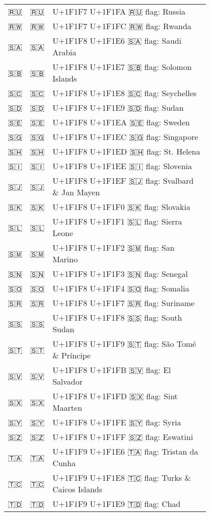 \documentclass[a4paper,12pt]{article}
\newcommand{\fontA}[1]{{\fontspec[RawFeature={mode=harf,+dist,+ccmp}]{Segoe UI Emoji} #1}}
\newcommand{\fontB}[1]{{\fontspec[RawFeature={mode=harf,+dist,+ccmp}]{Noto Color Emoji} #1}}
\begin{document}
\begin{longtable}[c]{ccp{0.8\linewidth}}
\fontA{🇷🇺}&\fontB{🇷🇺}&U+1F1F7 U+1F1FA 🇷🇺 flag: Russia\\
\fontA{🇷🇼}&\fontB{🇷🇼}&U+1F1F7 U+1F1FC 🇷🇼 flag: Rwanda\\
\fontA{🇸🇦}&\fontB{🇸🇦}&U+1F1F8 U+1F1E6 🇸🇦 flag: Saudi Arabia\\
\fontA{🇸🇧}&\fontB{🇸🇧}&U+1F1F8 U+1F1E7 🇸🇧 flag: Solomon Islands\\
\fontA{🇸🇨}&\fontB{🇸🇨}&U+1F1F8 U+1F1E8 🇸🇨 flag: Seychelles\\
\fontA{🇸🇩}&\fontB{🇸🇩}&U+1F1F8 U+1F1E9 🇸🇩 flag: Sudan\\
\fontA{🇸🇪}&\fontB{🇸🇪}&U+1F1F8 U+1F1EA 🇸🇪 flag: Sweden\\
\fontA{🇸🇬}&\fontB{🇸🇬}&U+1F1F8 U+1F1EC 🇸🇬 flag: Singapore\\
\fontA{🇸🇭}&\fontB{🇸🇭}&U+1F1F8 U+1F1ED 🇸🇭 flag: St. Helena\\
\fontA{🇸🇮}&\fontB{🇸🇮}&U+1F1F8 U+1F1EE 🇸🇮 flag: Slovenia\\
\fontA{🇸🇯}&\fontB{🇸🇯}&U+1F1F8 U+1F1EF 🇸🇯 flag: Svalbard \& Jan Mayen\\
\fontA{🇸🇰}&\fontB{🇸🇰}&U+1F1F8 U+1F1F0 🇸🇰 flag: Slovakia\\
\fontA{🇸🇱}&\fontB{🇸🇱}&U+1F1F8 U+1F1F1 🇸🇱 flag: Sierra Leone\\
\fontA{🇸🇲}&\fontB{🇸🇲}&U+1F1F8 U+1F1F2 🇸🇲 flag: San Marino\\
\fontA{🇸🇳}&\fontB{🇸🇳}&U+1F1F8 U+1F1F3 🇸🇳 flag: Senegal\\
\fontA{🇸🇴}&\fontB{🇸🇴}&U+1F1F8 U+1F1F4 🇸🇴 flag: Somalia\\
\fontA{🇸🇷}&\fontB{🇸🇷}&U+1F1F8 U+1F1F7 🇸🇷 flag: Suriname\\
\fontA{🇸🇸}&\fontB{🇸🇸}&U+1F1F8 U+1F1F8 🇸🇸 flag: South Sudan\\
\fontA{🇸🇹}&\fontB{🇸🇹}&U+1F1F8 U+1F1F9 🇸🇹 flag: São Tomé \& Príncipe\\
\fontA{🇸🇻}&\fontB{🇸🇻}&U+1F1F8 U+1F1FB 🇸🇻 flag: El Salvador\\
\fontA{🇸🇽}&\fontB{🇸🇽}&U+1F1F8 U+1F1FD 🇸🇽 flag: Sint Maarten\\
\fontA{🇸🇾}&\fontB{🇸🇾}&U+1F1F8 U+1F1FE 🇸🇾 flag: Syria\\
\fontA{🇸🇿}&\fontB{🇸🇿}&U+1F1F8 U+1F1FF 🇸🇿 flag: Eswatini\\
\fontA{🇹🇦}&\fontB{🇹🇦}&U+1F1F9 U+1F1E6 🇹🇦 flag: Tristan da Cunha\\
\fontA{🇹🇨}&\fontB{🇹🇨}&U+1F1F9 U+1F1E8 🇹🇨 flag: Turks \& Caicos Islands\\
\fontA{🇹🇩}&\fontB{🇹🇩}&U+1F1F9 U+1F1E9 🇹🇩 flag: Chad\\

\end{longtable}
\end{document}
